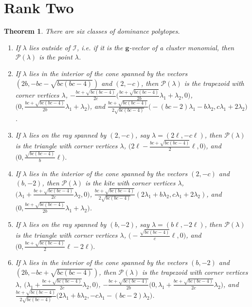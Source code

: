 \documentclass{amsart}
\newtheorem{theorem}{Theorem}
\numberwithin{theorem}{section}
\newcommand{\bfg}{\boldsymbol{g}}
\newcommand{\cI}{\mathcal{I}}
\newcommand{\cP}{\mathcal{P}}
\begin{document}
  \section{Rank Two}

  \begin{theorem}
    There are six classes of dominance polytopes.
    \begin{enumerate}
      \item If $\lambda$ lies outside of $\cI$, i.e. if it is the $\bfg$-vector of a cluster monomial, then $\cP(\lambda)$ is the point $\lambda$. 
      \item If $\lambda$ lies in the interior of the cone spanned by the vectors $(2b,-bc-\sqrt{bc(bc-4)})$ and $(2,-c)$, then $\cP(\lambda)$ is the trapezoid with corner vertices $\lambda$, $-\frac{bc+\sqrt{bc(bc-4)}}{2c}\big(\frac{bc+\sqrt{bc(bc-4)}}{2b}\lambda_1+\lambda_2,0\big)$, $\big(0,\frac{bc+\sqrt{bc(bc-4)}}{2b}\lambda_1+\lambda_2\big)$, and $\frac{bc+\sqrt{bc(bc-4)}}{2\sqrt{bc(bc-4)}}\big(-(bc-2)\lambda_1-b\lambda_2,c\lambda_1+2\lambda_2\big)$.
      \item If $\lambda$ lies on the ray spanned by $(2,-c)$, say $\lambda=(2\ell,-c\ell)$, then $\cP(\lambda)$ is the triangle with corner vertices $\lambda$, $\big(2\ell-\frac{bc+\sqrt{bc(bc-4)}}{2}\ell,0\big)$, and $\big(0,\frac{\sqrt{bc(bc-4)}}{b}\ell\big)$.
      \item If $\lambda$ lies in the interior of the cone spanned by the vectors $(2,-c)$ and $(b,-2)$, then $\cP(\lambda)$ is the kite with corner vertices $\lambda$, $\big(\lambda_1+\frac{bc+\sqrt{bc(bc-4)}}{2c}\lambda_2,0\big)$, $\frac{bc+\sqrt{bc(bc-4)}}{2\sqrt{bc(bc-4)}}(2\lambda_1+b\lambda_2,c\lambda_1+2\lambda_2)$, and $\big(0,\frac{bc+\sqrt{bc(bc-4)}}{2b}\lambda_1+\lambda_2\big)$.
      \item If $\lambda$ lies on the ray spanned by $(b,-2)$, say $\lambda=(b\ell,-2\ell)$, then $\cP(\lambda)$ is the triangle with corner vertices $\lambda$, $\big(-\frac{\sqrt{bc(bc-4)}}{c}\ell,0\big)$, and $\big(0,\frac{bc+\sqrt{bc(bc-4)}}{2}\ell-2\ell\big)$.
      \item If $\lambda$ lies in the interior of the cone spanned by the vectors $(b,-2)$ and $(2b,-bc+\sqrt{bc(bc-4)})$, then $\cP(\lambda)$ is the trapezoid with corner vertices $\lambda$, $\big(\lambda_1+\frac{bc+\sqrt{bc(bc-4)}}{2c}\lambda_2,0\big)$, $-\frac{bc+\sqrt{bc(bc-4)}}{2b}\big(0,\lambda_1+\frac{bc+\sqrt{bc(bc-4)}}{2c}\lambda_2\big)$, and $\frac{bc+\sqrt{bc(bc-4)}}{2\sqrt{bc(bc-4)}}\big(2\lambda_1+b\lambda_2,-c\lambda_1-(bc-2)\lambda_2\big)$.
    \end{enumerate}
  \end{theorem}
\end{document}
